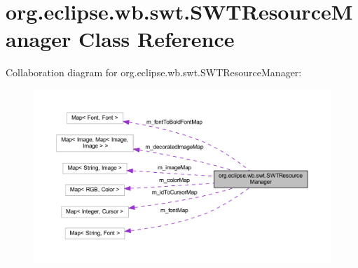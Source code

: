 \hypertarget{classorg_1_1eclipse_1_1wb_1_1swt_1_1_s_w_t_resource_manager}{\section{org.\-eclipse.\-wb.\-swt.\-S\-W\-T\-Resource\-Manager Class Reference}
\label{classorg_1_1eclipse_1_1wb_1_1swt_1_1_s_w_t_resource_manager}
}


Collaboration diagram for org.\-eclipse.\-wb.\-swt.\-S\-W\-T\-Resource\-Manager\-:\nopagebreak
\begin{figure}[H]
\begin{center}
\leavevmode
\includegraphics[width=350pt]{classorg_1_1eclipse_1_1wb_1_1swt_1_1_s_w_t_resource_manager__coll__graph}
\end{center}
\end{figure}
